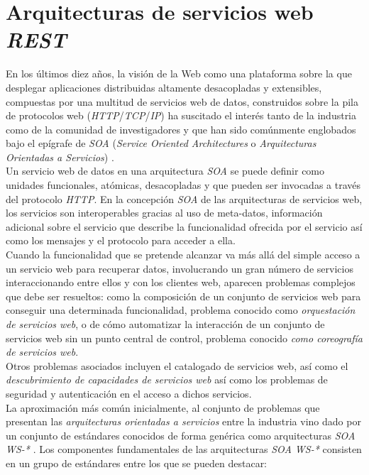 \section{Arquitecturas de servicios web \textit{REST}}

En los \'ultimos diez a\~nos, la visi\'on de la Web como una plataforma sobre la que desplegar aplicaciones distribuidas altamente desacopladas y extensibles, compuestas por una multitud de servicios web de datos, construidos sobre la pila de protocolos web (\textit{HTTP}/\textit{TCP}/\textit{IP}) ha suscitado el inter\'es tanto de la industria como de la comunidad de investigadores y que han sido com\'unmente englobados bajo el ep\'igrafe de \textit{SOA} (\textit{Service Oriented Architectures} o \textit{Arquitecturas Orientadas a Servicios}) \cite{soa}.\\
Un servicio web de datos en una arquitectura \textit{SOA} se puede definir como unidades funcionales, at\'omicas, desacopladas y que pueden ser invocadas a trav\'es del protocolo \textit{HTTP}. En la concepci\'on \textit{SOA} de las arquitecturas de servicios web, los servicios son interoperables gracias al uso de meta-datos, informaci\'on adicional sobre el servicio que describe la funcionalidad ofrecida por el servicio as\'i como los mensajes y el protocolo para acceder a ella.\\

Cuando la funcionalidad que se pretende alcanzar va m\'as all\'a del simple acceso a un servicio web para recuperar datos, involucrando un gran n\'umero de servicios interaccionando entre ellos y con los clientes web, aparecen problemas complejos que debe ser resueltos: como la composici\'on de un conjunto de servicios web para conseguir una determinada funcionalidad, problema conocido como \textit{orquestaci\'on de servicios web}, o de c\'omo automatizar la interacci\'on de un conjunto de servicios web sin un punto central de control, problema conocido \textit{como coreograf\'ia de servicios web}. \cite{orchestration_choreography}\\

Otros problemas asociados incluyen el catalogado de servicios web, as\'i como el \textit{descubrimiento de capacidades de servicios web} \cite{hoschek2002web} as\'i como los problemas de seguridad y autenticaci\'on en el acceso a dichos servicios.\\

La aproximaci\'on m\'as com\'un inicialmente, al conjunto de problemas que presentan las \textit{arquitecturas orientadas a servicios} entre la industria vino dado por un conjunto de est\'andares conocidos de forma gen\'erica como arquitecturas \textit{SOA WS-*} \cite{viering2009lacking}. 
Los componentes fundamentales de las arquitecturas \textit{SOA WS-*} consisten en un grupo de est\'andares entre los que se pueden destacar:\\

